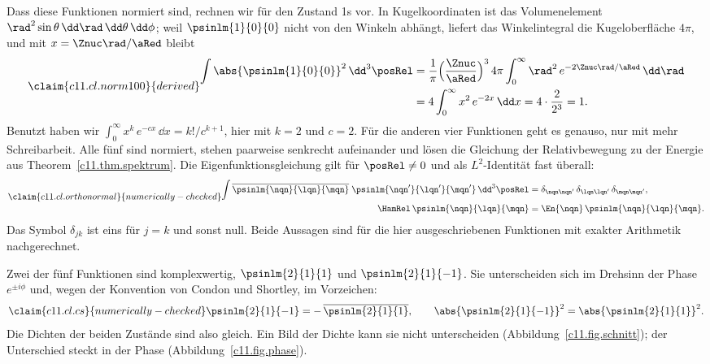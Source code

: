 Dass diese Funktionen normiert sind, rechnen wir für den Zustand 1s vor. In
Kugelkoordinaten ist das Volumenelement $\rad^2\sin\theta\,\dd\rad\,\dd\theta\,\dd\phi$;
weil $\psinlm{1}{0}{0}$ nicht von den Winkeln abhängt, liefert das Winkelintegral die
Kugeloberfläche $4\pi$, und mit $x = \Znuc\rad/\aRed$ bleibt
\begin{equation}\label{c11.eq.norm100}\claim{c11.cl.norm100}{derived}
  \begin{aligned}
    \int \abs{\psinlm{1}{0}{0}}^2\,\dd^3\posRel
    &= \frac{1}{\pi}\Bigl(\frac{\Znuc}{\aRed}\Bigr)^{3}\,4\pi
      \int_0^\infty \rad^2\,e^{-2\Znuc\rad/\aRed}\,\dd\rad \\
    &= 4\int_0^\infty x^2\,e^{-2x}\,\dd x
     = 4 \cdot \frac{2}{2^3} = 1 .
  \end{aligned}
\end{equation}
Benutzt haben wir $\int_0^\infty x^k\,e^{-cx}\,\dd x = k!/c^{k + 1}$, hier mit $k = 2$
und $c = 2$. Für die anderen vier Funktionen geht es genauso, nur mit mehr Schreibarbeit.
Alle fünf sind normiert, stehen paarweise senkrecht aufeinander und lösen die Gleichung
der Relativbewegung zu der Energie aus Theorem~\ref{c11.thm.spektrum}. Die
Eigenfunktionsgleichung gilt für $\posRel \neq 0$ und als $L^2$-Identität fast überall:
\begin{equation}\label{c11.eq.orthonormal}\claim{c11.cl.orthonormal}{numerically-checked}
  \begin{aligned}
    \int \overline{\psinlm{\nqn}{\lqn}{\mqn}}\;\psinlm{\nqn'}{\lqn'}{\mqn'}\,\dd^3\posRel
    &= \delta_{\nqn\nqn'}\,\delta_{\lqn\lqn'}\,\delta_{\mqn\mqn'}, \\
    \HamRel\,\psinlm{\nqn}{\lqn}{\mqn} &= \En{\nqn}\,\psinlm{\nqn}{\lqn}{\mqn}.
  \end{aligned}
\end{equation}
Das Symbol $\delta_{jk}$ ist eins für $j = k$ und sonst null. Beide Aussagen sind für
die hier ausgeschriebenen Funktionen mit exakter Arithmetik nachgerechnet.

Zwei der fünf Funktionen sind komplexwertig, $\psinlm{2}{1}{1}$ und $\psinlm{2}{1}{-1}$.
Sie unterscheiden sich im Drehsinn der Phase $e^{\pm i\phi}$ und, wegen der Konvention
von Condon und Shortley, im Vorzeichen:
\begin{equation}\label{c11.eq.cs}\claim{c11.cl.cs}{numerically-checked}
  \psinlm{2}{1}{-1} = -\,\overline{\psinlm{2}{1}{1}},
  \qquad
  \abs{\psinlm{2}{1}{-1}}^2 = \abs{\psinlm{2}{1}{1}}^2 .
\end{equation}
Die Dichten der beiden Zustände sind also gleich. Ein Bild der Dichte kann sie nicht
unterscheiden (Abbildung~\ref{c11.fig.schnitt}); der Unterschied steckt in der Phase
(Abbildung~\ref{c11.fig.phase}).

